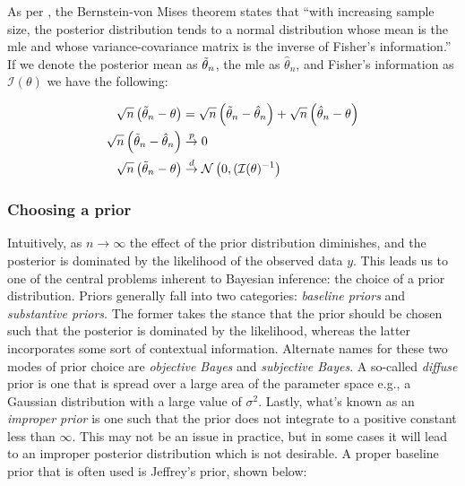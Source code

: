 \documentclass{report}
\begin{document}
As per \cite[Chapter~3.3]{wakefield_bayesian_2013}, the Bernstein-von Mises theorem states that ``with increasing sample size, the posterior distribution tends to a normal distribution whose mean is the \gls{mle} and whose variance-covariance matrix is the inverse of Fisher's information.'' If we denote the posterior mean as $\Tilde{\theta}_n$, the \gls{mle} as $\hat{\theta}_n$, and Fisher's information as $\mathcal{I}(\theta)$ we have the following:

\begin{equation}\label{eq:ols-bayes-posterior-mean-asymptotics}
    \begin{aligned}
        \sqrt{n}\left(\Tilde{\theta}_n - \theta\right) &= \sqrt{n}\left(\Tilde{\theta}_n - \hat{\theta}_n\right) + \sqrt{n}\left(\hat{\theta}_n - \theta\right) \\
        \sqrt{n}\left(\Tilde{\theta}_n - \hat{\theta}_n\right) &\overset{p}{\to} 0 \\
        \sqrt{n}\left(\Tilde{\theta}_n - \theta\right) &\overset{d}{\to} \mathcal{N}\left(0, (\mathcal{I}(\theta)^{-1}\right) \\
    \end{aligned}
\end{equation}

\subsubsection{Choosing a prior}

Intuitively, as $n \to \infty$ the effect of the prior distribution diminishes, and the posterior is dominated by the likelihood of the observed data $y$. This leads us to one of the central problems inherent to Bayesian inference: the choice of a prior distribution. Priors generally fall into two categories: \textit{baseline priors} and \textit{substantive priors}. The former takes the stance that the prior should be chosen such that the posterior is dominated by the likelihood, whereas the latter incorporates some sort of contextual information. Alternate names for these two modes of prior choice are \textit{objective Bayes} and \textit{subjective Bayes}. A so-called \textit{diffuse} prior is one that is spread over a large area of the parameter space e.g., a Gaussian distribution with a large value of $\sigma^2$. Lastly, what's known as an \textit{improper prior} is one such that the prior does not integrate to a positive constant less than $\infty$. This may not be an issue in practice, but in some cases it will lead to an improper posterior distribution which is not desirable. A proper baseline prior that is often used is Jeffrey's prior, shown below:
\end{document}
